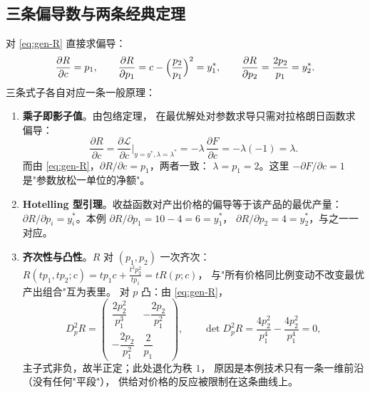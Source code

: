 \subsection{三条偏导数与两条经典定理}

对 \eqref{eq:gen-R} 直接求偏导：
\begin{equation}
\frac{\partial R}{\partial c}=p_1,
\qquad
\frac{\partial R}{\partial p_1}=c-\Bigl(\frac{p_2}{p_1}\Bigr)^{2}=y_1^{*},
\qquad
\frac{\partial R}{\partial p_2}=\frac{2p_2}{p_1}=y_2^{*}.
\label{eq:R-partials}
\end{equation}
三条式子各自对应一条一般原理：

\begin{enumerate}
  \item \textbf{乘子即影子值}。由包络定理，
        在最优解处对参数求导只需对拉格朗日函数求偏导：
        \begin{equation}
        \frac{\partial R}{\partial c}
        =\frac{\partial \mathcal{L}}{\partial c}\bigg|_{y=y^{*},\lambda=\lambda^{*}}
        =-\lambda\,\frac{\partial F}{\partial c}
        =-\lambda(-1)=\lambda.
        \label{eq:envelope}
        \end{equation}
        而由 \eqref{eq:gen-R}，$\partial R/\partial c=p_1$，两者一致：
        $\lambda=p_1=2$。这里 $-\partial F/\partial c=1$ 是"参数放松一单位的净额"。
  \item \textbf{Hotelling 型引理}。收益函数对产出价格的偏导等于该产品的最优产量：
        $\partial R/\partial p_i=y_i^{*}$。本例 $\partial R/\partial p_1=10-4=6=y_1^{*}$，
        $\partial R/\partial p_2=4=y_2^{*}$，与之一一对应。
  \item \textbf{齐次性与凸性}。$R$ 对 $(p_1,p_2)$ 一次齐次：
        $R(tp_1,tp_2;c)=tp_1c+\frac{t^{2}p_2^{2}}{tp_1}=tR(p;c)$，
        与"所有价格同比例变动不改变最优产出组合"互为表里。
        对 $p$ 凸：由 \eqref{eq:gen-R}，
        \begin{equation}
        D^{2}_{p}R=
        \begin{pmatrix}
        \dfrac{2p_2^{2}}{p_1^{3}} & -\dfrac{2p_2}{p_1^{2}}\\[6pt]
        -\dfrac{2p_2}{p_1^{2}} & \dfrac{2}{p_1}
        \end{pmatrix},
        \qquad
        \det D^{2}_{p}R=\frac{4p_2^{2}}{p_1^{4}}-\frac{4p_2^{2}}{p_1^{4}}=0,
        \label{eq:hessian-R}
        \end{equation}
        主子式非负，故半正定；此处退化为秩 $1$，
        原因是本例技术只有一条一维前沿（没有任何"平段"），
        供给对价格的反应被限制在这条曲线上。
\end{enumerate}

